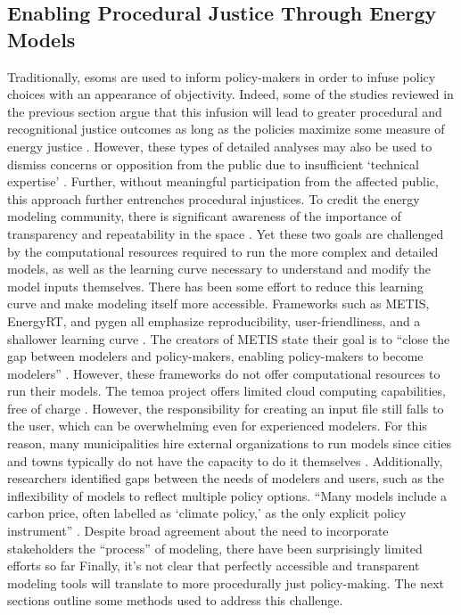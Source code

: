 \subsection{Enabling Procedural Justice Through Energy Models}

Traditionally, \acp{esom} are used to inform policy-makers \cite{li_open_2020}
in order to infuse policy choices with an appearance of objectivity. Indeed,
some of the studies reviewed in the previous section argue that this infusion
will lead to greater procedural and recognitional justice outcomes as long as
the policies maximize some measure of energy justice
\cite{chapman_prioritizing_2018, heffron_resolving_2015}. However, these types
of detailed analyses may also be used to dismiss concerns or opposition from the
public due to insufficient `technical expertise' \cite{johnson_dakota_2021, susser_better_2022}.
Further, without meaningful participation from the affected public, this
approach further entrenches procedural injustices. To credit the energy modeling
community, there is significant awareness of the importance of transparency and
repeatability in the space \cite{decarolis_case_2012, pfenninger_energy_2014,
pfenninger_openmod_2022, forster_open_2022, hilpert_open_2018}. Yet these two
goals are challenged by the computational resources required to run the more
complex and detailed models, as well as the learning curve necessary to
understand and modify the model inputs themselves. There has been some effort to
reduce this learning curve and make modeling itself more accessible. Frameworks
such as METIS, EnergyRT, and \ac{pygen} all emphasize reproducibility,
user-friendliness, and a shallower learning curve \cite{sakellaris_metis_2018,
lugovoy_energyrt_2022, dotson_python_2021}. The creators of METIS state their
goal is to ``close the gap between modelers and policy-makers, enabling
policy-makers to become modelers'' \cite{sakellaris_metis_2018}. However, these
frameworks do not offer computational resources to run their models. The
\ac{temoa} project offers limited cloud computing capabilities, free of charge
\cite{temoa_project_temoa_2023}. However, the responsibility for creating an
input file still falls to the user, which can be overwhelming even for
experienced modelers. 
For this reason, many municipalities hire external organizations to run models
since cities and towns typically do not have the capacity to do it themselves
\cite{ben_amer_too_2020, johannsen_designing_2021}. Additionally, researchers
identified gaps between the needs of modelers and users, such as the inflexibility
of models to reflect multiple policy options. ``Many models include a carbon price,
often labelled as `climate policy,' as the only explicit policy instrument'' 
\cite{susser_better_2022}. Despite broad agreement about the need to incorporate
stakeholders the ``process'' of modeling, there have been surprisingly limited
efforts so far \cite{ben_amer_too_2020,johannsen_designing_2021,susser_better_2022}
Finally, it's not clear that perfectly accessible and transparent modeling tools
will translate to more procedurally just policy-making. The next sections
outline some methods used to address this challenge.

